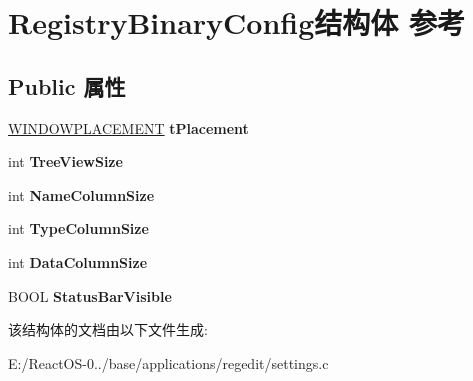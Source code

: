 \hypertarget{struct_registry_binary_config}{}\section{Registry\+Binary\+Config结构体 参考}
\label{struct_registry_binary_config}
\subsection*{Public 属性}
\begin{DoxyCompactItemize}
\item 
\mbox{\label{struct_registry_binary_config_aa19d021b2257c0cc450fd1c397b8f745}} 
\hyperlink{struct___w_i_n_d_o_w_p_l_a_c_e_m_e_n_t}{W\+I\+N\+D\+O\+W\+P\+L\+A\+C\+E\+M\+E\+NT} {\bfseries t\+Placement}
\item 
\mbox{\label{struct_registry_binary_config_aa1de57c50643c7d636a1c81466c6e19a}} 
int {\bfseries Tree\+View\+Size}
\item 
\mbox{\label{struct_registry_binary_config_a2863640cae6abe955ad56f8b52d9c640}} 
int {\bfseries Name\+Column\+Size}
\item 
\mbox{\label{struct_registry_binary_config_aa350f6c1c5c0426382c6eefad6094a34}} 
int {\bfseries Type\+Column\+Size}
\item 
\mbox{\label{struct_registry_binary_config_acfd361ff5b78d0dc37ac9d79368fc1e6}} 
int {\bfseries Data\+Column\+Size}
\item 
\mbox{\label{struct_registry_binary_config_ae834e735015670a6c4fe13d096d42129}} 
B\+O\+OL {\bfseries Status\+Bar\+Visible}
\end{DoxyCompactItemize}


该结构体的文档由以下文件生成\+:\begin{DoxyCompactItemize}
\item 
E\+:/\+React\+O\+S-\/0../base/applications/regedit/settings.\+c\end{DoxyCompactItemize}
